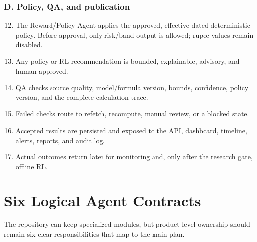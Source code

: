 \documentclass[11pt,a4paper]{article}
\begin{document}
\subsubsection*{D. Policy, QA, and publication}
\begin{enumerate}
  \setcounter{enumi}{11}
  \item The Reward/Policy Agent applies the approved, effective-dated deterministic policy.
        Before approval, only risk/band output is allowed; rupee values remain disabled.
  \item Any policy or RL recommendation is bounded, explainable, advisory, and human-approved.
  \item QA checks source quality, model/formula version, bounds, confidence, policy version,
        and the complete calculation trace.
  \item Failed checks route to refetch, recompute, manual review, or a blocked state.
  \item Accepted results are persisted and exposed to the API, dashboard, timeline, alerts,
        reports, and audit log.
  \item Actual outcomes return later for monitoring and, only after the research gate, offline RL.
\end{enumerate}

\section{Six Logical Agent Contracts}

The repository can keep specialized modules, but product-level ownership should remain six
clear responsibilities that map to the main plan.
\end{document}
